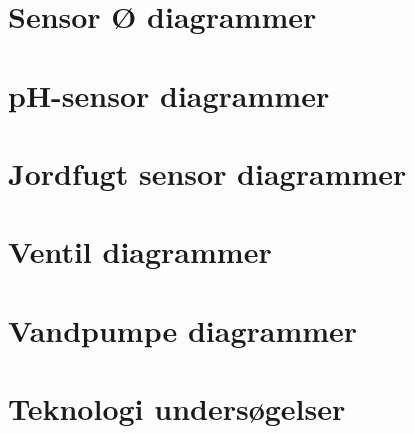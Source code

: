 \newpage

\section{Sensor Ø diagrammer}



\newpage

\section{pH-sensor diagrammer}



\newpage

\section{Jordfugt sensor diagrammer}



\newpage

\section{Ventil diagrammer}



\newpage

\section{Vandpumpe diagrammer}



\newpage

\newpage

\section{Teknologi undersøgelser}

%